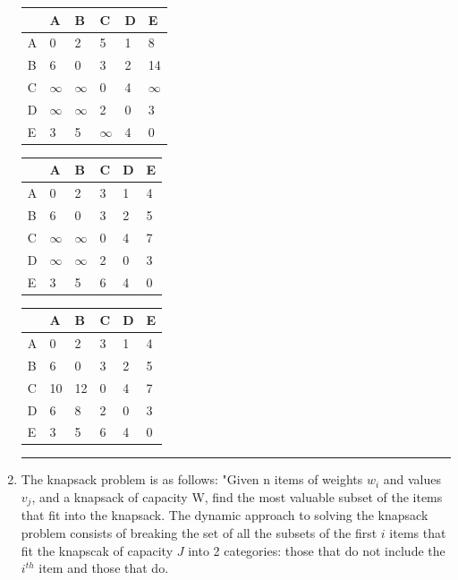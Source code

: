 \documentclass{article}
\begin{document}
\begin{enumerate}
\begin{table}[H]
\begin{tabular}{|l|l|l|l|l|l|}
\hline
 & A & B & C & D & E \\ \hline
A & 0 & 2 & 5 & 1 & 8 \\ \hline
B & 6 & 0 & 3 & 2 & 14 \\ \hline
C & $\infty$ & $\infty$ & 0 & 4 & $\infty$ \\ \hline
D & $\infty$ & $\infty$ & 2 & 0 & 3 \\ \hline
E & 3 & 5 & $\infty$ & 4 & 0 \\ \hline
\end{tabular}
\end{table}



\begin{table}[H]
\begin{tabular}{|l|l|l|l|l|l|}
\hline
 & A & B & C & D & E \\ \hline
A & 0 & 2 & 3 & 1 & 4 \\ \hline
B & 6 & 0 & 3 & 2 & 5 \\ \hline
C & $\infty$ & $\infty$ & 0 & 4 & 7 \\ \hline
D & $\infty$ & $\infty$ & 2 & 0 & 3 \\ \hline
E & 3 & 5 & 6 & 4 & 0 \\ \hline
\end{tabular}
\end{table}


\begin{table}[H]
\begin{tabular}{|l|l|l|l|l|l|}
\hline
 & A & B & C & D & E \\ \hline
A & 0 & 2 & 3 & 1 & 4 \\ \hline
B & 6 & 0 & 3 & 2 & 5 \\ \hline
C & 10 & 12 & 0 & 4 & 7 \\ \hline
D & 6 & 8 & 2 & 0 & 3 \\ \hline
E & 3 & 5 & 6 & 4 & 0 \\ \hline
\end{tabular}
\end{table}



\noindent\rule{8cm}{0.4pt}

\item The knapsack problem is as follows: "Given n items of weights $w_i$ and values $v_j$, and a knapsack of capacity W, find the most valuable subset of the items that fit into the knapsack. The dynamic approach to solving the knapsack problem consists of breaking the set of all the subsets of the first $i$ items that fit the knapscak of capacity $J$ into 2 categories: those that do not include the $i^{th}$ item and those that do. 


\end{enumerate}
\end{document}
